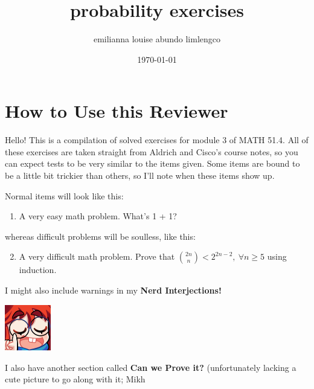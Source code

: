 \documentclass{article}
\title{probability exercises}
\author{emilianna louise abundo limlengco}
\date{\today}
\begin{document}
 

\section*{How to Use this Reviewer}
Hello! This is a compilation of solved exercises for module 3 of MATH 51.4. All of these exercises are taken straight from Aldrich and Cisco's course notes, so you can expect tests 
to be very similar to the items given. Some items are bound to be a little bit trickier than others, so I'll note when these items show up.\par Normal items will look like this:\begin{enumerate} 
    \item A very easy math problem. What's 1 + 1?
\end{enumerate} 
whereas difficult problems will be soulless, like this:\begin{enumerate}\setcounter{enumi}{1}
    \item A very difficult math problem. Prove that $\displaystyle \binom{2n}{n} < 2^{2n-2},~\forall n \geq 5$ using induction. 
\end{enumerate} I might also include warnings in my \textbf{Nerd Interjections!}\par
\parindent=25pt \begin{minipage}[t]{.14\textwidth}
    \vspace{0pt}
    \includegraphics[width=2cm]{nerd_maddy.png}
\end{minipage}%
\parindent=0pt \par I also have another section called \textbf{Can we Prove it?} (unfortunately lacking a cute picture to go along with it; Mikh 
\end{document}
